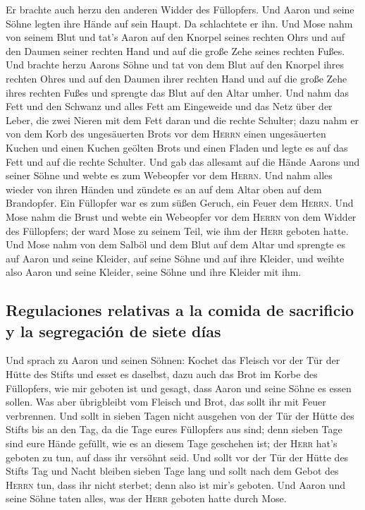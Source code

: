  Er brachte auch herzu den anderen Widder des Füllopfers.
Und Aaron und seine Söhne legten ihre Hände auf sein Haupt.
 Da schlachtete er ihn. Und Mose nahm von seinem Blut und
tat's Aaron auf den Knorpel seines rechten Ohrs und auf den Daumen
seiner rechten Hand und auf die große Zehe seines rechten Fußes.
 Und brachte herzu Aarons Söhne und tat von dem Blut auf
den Knorpel ihres rechten Ohres und auf den Daumen ihrer rechten Hand
und auf die große Zehe ihres rechten Fußes und sprengte das Blut auf den
Altar umher.  Und nahm das Fett und den Schwanz und alles
Fett am Eingeweide und das Netz über der Leber, die zwei Nieren mit dem
Fett daran und die rechte Schulter;  dazu nahm er von dem
Korb des ungesäuerten Brots vor dem \textsc{Herrn} einen ungesäuerten
Kuchen und einen Kuchen geölten Brots und einen Fladen und legte es auf
das Fett und auf die rechte Schulter.  Und gab das
allesamt auf die Hände Aarons und seiner Söhne und webte es zum
Webeopfer vor dem \textsc{Herrn}.  Und nahm alles wieder
von ihren Händen und zündete es an auf dem Altar oben auf dem
Brandopfer. Ein Füllopfer war es zum süßen Geruch, ein Feuer dem
\textsc{Herrn}.  Und Mose nahm die Brust und webte ein
Webeopfer vor dem \textsc{Herrn} von dem Widder des Füllopfers; der ward
Mose zu seinem Teil, wie ihm der \textsc{Herr} geboten hatte.
 Und Mose nahm von dem Salböl und dem Blut auf dem Altar
und sprengte es auf Aaron und seine Kleider, auf seine Söhne und auf
ihre Kleider, und weihte also Aaron und seine Kleider, seine Söhne und
ihre Kleider mit ihm.

\hypertarget{regulaciones-relativas-a-la-comida-de-sacrificio-y-la-segregaciuxf3n-de-siete-duxedas}{%
\subsection{Regulaciones relativas a la comida de sacrificio y la
segregación de siete
días}\label{regulaciones-relativas-a-la-comida-de-sacrificio-y-la-segregaciuxf3n-de-siete-duxedas}}

 Und sprach zu Aaron und seinen Söhnen: Kochet das
Fleisch vor der Tür der Hütte des Stifts und esset es daselbst, dazu
auch das Brot im Korbe des Füllopfers, wie mir geboten ist und gesagt,
dass Aaron und seine Söhne es essen sollen.  Was aber
übrigbleibt vom Fleisch und Brot, das sollt ihr mit Feuer verbrennen.
 Und sollt in sieben Tagen nicht ausgehen von der Tür der
Hütte des Stifts bis an den Tag, da die Tage eures Füllopfers aus sind;
denn sieben Tage sind eure Hände gefüllt,  wie es an
diesem Tage geschehen ist; der \textsc{Herr} hat's geboten zu tun, auf
dass ihr versöhnt seid.  Und sollt vor der Tür der Hütte
des Stifts Tag und Nacht bleiben sieben Tage lang und sollt nach dem
Gebot des \textsc{Herrn} tun, dass ihr nicht sterbet; denn also ist
mir's geboten.  Und Aaron und seine Söhne taten alles,
was der \textsc{Herr} geboten hatte durch Mose.

